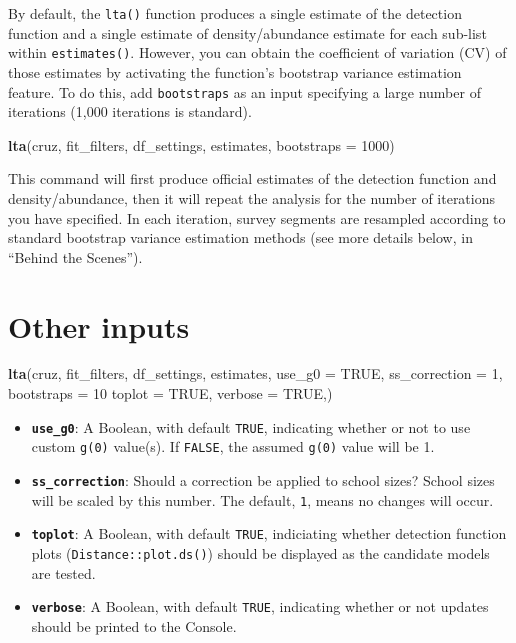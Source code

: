\documentclass[
]{book}
\newenvironment{Shaded}{\begin{snugshade}}{\end{snugshade}}
\newcommand{\DataTypeTok}[1]{\textcolor[rgb]{0.13,0.29,0.53}{#1}}
\newcommand{\DecValTok}[1]{\textcolor[rgb]{0.00,0.00,0.81}{#1}}
\newcommand{\KeywordTok}[1]{\textcolor[rgb]{0.13,0.29,0.53}{\textbf{#1}}}
\newcommand{\NormalTok}[1]{#1}
\newcommand{\OtherTok}[1]{\textcolor[rgb]{0.56,0.35,0.01}{#1}}
\begin{document}
By default, the \texttt{lta()} function produces a single estimate of the detection function and a single estimate of density/abundance estimate for each sub-list within \texttt{estimates()}. However, you can obtain the coefficient of variation (CV) of those estimates by activating the function's bootstrap variance estimation feature. To do this, add \texttt{bootstraps} as an input specifying a large number of iterations (1,000 iterations is standard).

\begin{Shaded}
\begin{Highlighting}[]
\KeywordTok{lta}\NormalTok{(cruz,}
\NormalTok{    fit_filters,}
\NormalTok{    df_settings,}
\NormalTok{    estimates,}
    \DataTypeTok{bootstraps =} \DecValTok{1000}\NormalTok{)}
\end{Highlighting}
\end{Shaded}

This command will first produce official estimates of the detection function and density/abundance, then it will repeat the analysis for the number of iterations you have specified. In each iteration, survey segments are resampled according to standard bootstrap variance estimation methods (see more details below, in ``Behind the Scenes'').

\hypertarget{other-inputs}{%
\section*{Other inputs}\label{other-inputs}}

\begin{Shaded}
\begin{Highlighting}[]
\KeywordTok{lta}\NormalTok{(cruz,}
\NormalTok{    fit_filters,}
\NormalTok{    df_settings,}
\NormalTok{    estimates,}
    \DataTypeTok{use_g0 =} \OtherTok{TRUE}\NormalTok{,}
    \DataTypeTok{ss_correction =} \DecValTok{1}\NormalTok{,}
    \DataTypeTok{bootstraps =} \DecValTok{10}
    \DataTypeTok{toplot =} \OtherTok{TRUE}\NormalTok{,}
    \DataTypeTok{verbose =} \OtherTok{TRUE}\NormalTok{,)}
\end{Highlighting}
\end{Shaded}

\begin{itemize}
\item
  \textbf{\texttt{use\_g0}}: A Boolean, with default \texttt{TRUE}, indicating whether or not to use custom \texttt{g(0)} value(s). If \texttt{FALSE}, the assumed \texttt{g(0)} value will be 1.
\item
  \textbf{\texttt{ss\_correction}}: Should a correction be applied to school sizes? School sizes will be scaled by this number. The default, \texttt{1}, means no changes will occur.
\item
  \textbf{\texttt{toplot}}: A Boolean, with default \texttt{TRUE}, indiciating whether detection function plots (\texttt{Distance::plot.ds()}) should be displayed as the candidate models are tested.
\item
  \textbf{\texttt{verbose}}: A Boolean, with default \texttt{TRUE}, indicating whether or not updates should be printed to the Console.
\end{itemize}
\end{document}
